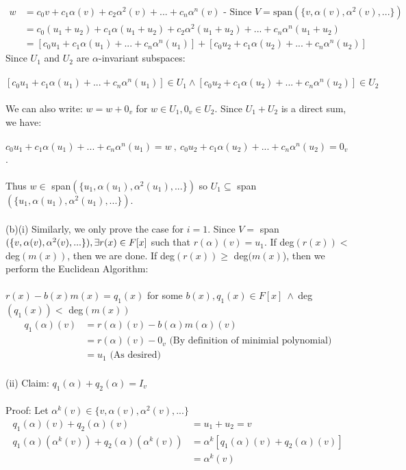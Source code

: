 \documentclass{article}
\begin{document}
\begin{align*}
w&=c_0v + c_1\alpha(v) + c_2\alpha^2(v) + ... + c_n\alpha^n(v) \text{ - Since } V = \text{span}(\{v,\alpha(v),\alpha^2(v),...\})\\
&=c_0(u_1+u_2) + c_1\alpha(u_1+u_2) + c_2\alpha^2(u_1+u_2) + ... + c_n\alpha^n(u_1+u_2)\\
&=[c_0u_1 + c_1\alpha(u_1) + ... + c_n\alpha^n(u_1)] + [c_0u_2 + c_1\alpha(u_2) + ... + c_n\alpha^n(u_2)]
\end{align*}
Since $U_1$ and $U_2$ are $\alpha$-invariant subspaces:\\\\ $[c_0u_1 + c_1\alpha(u_1) + ... + c_n\alpha^n(u_1)]\in U_1 \land [c_0u_2 + c_1\alpha(u_2) + ... + c_n\alpha^n(u_2)]\in U_2$\\\\
We can also write: $w = w + 0_v$ for $w\in U_1, 0_v\in U_2.$ Since $U_1 + U_2$ is a direct sum, we have:\\\\
$c_0u_1 + c_1\alpha(u_1) + ... + c_n\alpha^n(u_1) = w \ , \ 
c_0u_2 + c_1\alpha(u_2) + ... + c_n\alpha^n(u_2) = 0_v$.\\\\
Thus $w\in$ span$(\{u_1,\alpha(u_1),\alpha^2(u_1),...\})$ so $U_1 \subseteq$ span$(\{u_1,\alpha(u_1),\alpha^2(u_1),...\}).$\\\\
(b)(i) Similarly, we only prove the case for $i=1$. Since $V = $ span$(\{v,\alpha(v),\alpha^2(v),...\}),\\ \exists r(x) \in F[x]$ such that $r(\alpha)(v) = u_1$. If deg$(r(x)) < $ deg$(m(x))$, then we are done. If deg$(r(x)) \geq $ deg$(m(x)$), then we perform the Euclidean Algorithm:\\\\
$r(x) - b(x)m(x) = q_1(x)$ for some $b(x),q_1(x)\in F[x]\  \land \  $deg$(q_1(x)) <  $ deg$(m(x))$\begin{align*}
q_1(\alpha)(v) &= r(\alpha)(v) - b(\alpha)m(\alpha)(v) \\&= r(\alpha)(v) - 0_v \text{  (By definition of minimial polynomial)} \\&= u_1 \text{ (As desired)}
\end{align*}\\
(ii) Claim: $q_1(\alpha) + q_2(\alpha) = I_v$\\\\
Proof: Let $\alpha^k(v) \in \{v,\alpha(v),\alpha^2(v),...\}$\begin{align*}
q_1(\alpha)(v) + q_2(\alpha)(v) &= u_1 + u_2 = v\\ q_1(\alpha)(\alpha^k(v)) + q_2(\alpha)(\alpha^k(v)) &= \alpha^k[q_1(\alpha)(v) + q_2(\alpha)(v)] \\ &= \alpha^k(v)
\end{align*}
\end{document}
